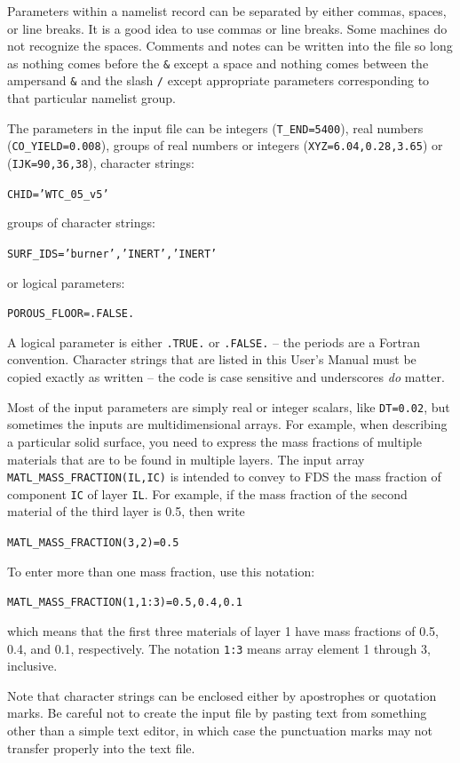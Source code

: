\documentclass[11pt]{book}
\newcommand{\ct}{\tt\small}
\begin{document}
Parameters within a namelist record can be separated by either commas, spaces, or line breaks. It is a good idea to use
commas or line breaks. Some machines do not recognize the spaces.
Comments and notes can be written into the file so long as nothing comes
before the {\ct \&} except a space and nothing comes between the ampersand
{\ct \&} and the slash {\ct /} except appropriate parameters corresponding
to that particular namelist group.

The parameters in the input file can be integers ({\ct T\_END=5400}),
real numbers ({\ct CO\_YIELD=0.008}), groups of real numbers or integers
({\ct XYZ=6.04,0.28,3.65}) or ({\ct IJK=90,36,38}),
character strings:

{\ct CHID='WTC\_05\_v5'}

\noindent
groups of character strings:

{\ct SURF\_IDS='burner','INERT','INERT'}

\noindent
or logical parameters:

{\ct POROUS\_FLOOR=.FALSE.}

\noindent
A logical parameter is either
{\ct .TRUE.} or {\ct .FALSE.} -- the periods are a
Fortran convention. Character strings that are listed in
this User's Manual must be copied exactly as written -- the code
is case sensitive and underscores {\em do} matter.

Most of the input parameters are simply real or integer scalars, like {\ct DT=0.02}, but sometimes the inputs are
multidimensional arrays. For example, when describing a particular solid surface, you need to express the mass
fractions of multiple materials that are to be found in multiple layers. The input array {\ct MATL\_MASS\_FRACTION(IL,IC)} is
intended to convey to FDS the mass fraction of component {\ct IC} of layer {\ct IL}. For example, if the mass fraction of the
second material of the third layer is 0.5, then write

{\ct MATL\_MASS\_FRACTION(3,2)=0.5}

\noindent
To enter more than one mass fraction, use
this notation:

{\ct MATL\_MASS\_FRACTION(1,1:3)=0.5,0.4,0.1}

\noindent
which means that the first three materials of layer 1 have
mass fractions of 0.5, 0.4, and 0.1, respectively. The notation {\ct 1:3} means array element 1 through 3, inclusive.



\begin{warning}
\noindent
Note that character strings can be enclosed either by apostrophes or quotation marks.
Be careful not to create the input file by pasting text from something other than a
simple text editor, in which case the punctuation marks may not transfer
properly into the text file.
\end{warning}
\end{document}
